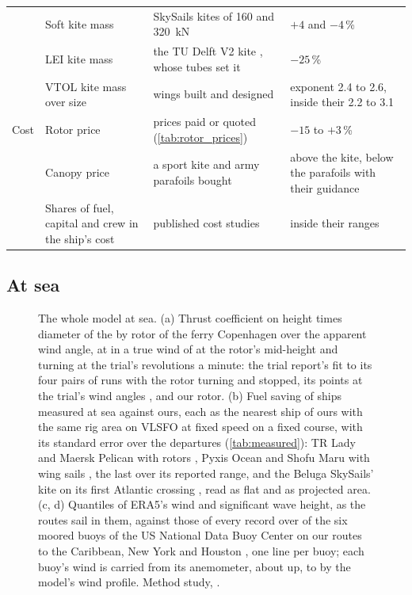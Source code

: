 \begin{table}[tbp]
{\begin{tabular}{@{}l>{\raggedright\arraybackslash}p{4.4cm}>{\raggedright\arraybackslash}p{5.4cm}>{\raggedright\arraybackslash}p{4.4cm}@{}}
 & Soft kite mass & SkySails kites of 160 and \SI{320}{kN} \citep{paulig2013} & $+4$ and $-4$\,\% \\
 & LEI kite mass & the TU Delft V2 kite \citep{schwoll2012}, whose tubes set it & $-25$\,\% \\
 & VTOL kite mass over size & wings built and designed \citep{sommerfeld2022scaling,vanhagen2023,noth2008} & exponent 2.4 to 2.6, inside their 2.2 to 3.1 \\
\addlinespace
Cost & Rotor price & 4 prices paid or quoted (\cref{tab:rotor_prices}) & $-15$ to $+3$\,\% \\
 & Canopy price & a sport kite \citep{varuste2026soul21} and army parafoils bought \citep{army2014ma7804} & above the kite, below the parafoils with their guidance \\
 & Shares of fuel, capital and crew in the ship's cost & published cost studies \citep{karvonen2020,healy2019} & inside their ranges \\
\bottomrule
\end{tabular}}
\end{table}

\subsection{At sea}
\label{sec:measured}

\begin{figure}[tbp]
\centering
{}
\caption{The whole model at sea. (a) Thrust coefficient on height times diameter of the  by  rotor of the ferry Copenhagen over the apparent wind angle, at  in a true wind of  at the rotor's mid-height and turning at the trial's  revolutions a minute: the trial report's fit to its four pairs of runs with the rotor turning and stopped, its points at the trial's wind angles \citep{werner2023copenhagen}, and our rotor. (b) Fuel saving of ships measured at sea against ours, each as the nearest ship of ours with the same rig area on VLSFO at fixed speed on a fixed course, with its standard error over the departures (\cref{tab:measured}): TR Lady and Maersk Pelican with rotors \citep{lr2025trlady,norsepower2019pelican}, Pyxis Ocean and Shofu Maru with wing sails \citep{gcaptain2024pyxis,mol2024shofu}, the last over its reported range, and the Beluga SkySails' kite on its first Atlantic crossing \citep{verkehrsrundschau2008beluga}, read as flat and as projected area. (c, d) Quantiles of ERA5's  wind and significant wave height, as the routes sail in them, against those of every record over  of the six moored buoys of the US National Data Buoy Center on our routes to the Caribbean, New York and Houston \citep{ndbc2026stdmet}, one line per buoy; each buoy's wind is carried from its anemometer, about  up, to  by the model's wind profile. Method study, .}
\label{fig:validation_sea}
\end{figure}

